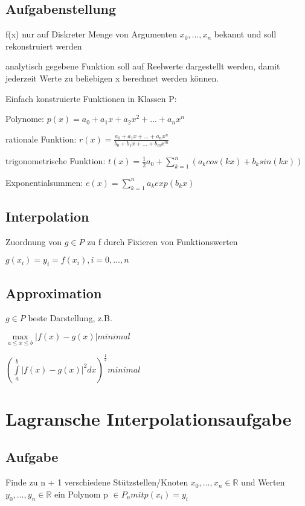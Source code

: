 \documentclass[12pt,a4paper]{article} %
\begin{document}
	\subsection{Aufgabenstellung}
	
	f(x) nur auf Diskreter Menge von Argumenten $x_0, ..., x_n$ bekannt und soll rekonstruiert werden
	
	analytisch gegebene Funktion soll auf Reelwerte dargestellt werden, damit jederzeit Werte zu beliebigen x berechnet werden können.
	
	Einfach konstruierte Funktionen in Klassen P:
	
	Polynome: $p(x) = a_0 + a_1x + a_2x^2 + ... + a_nx^n$
	
	rationale Funktion: $r(x) = \frac{a_0 + a_1x + ... + a_nx^n}{b_0 + b_1x + ... + b_mx^m}$
	
	trigonometrische Funktion: $t(x) = \frac{1}{2}a_0 + \sum\limits_{k = 1}^{n}(a_kcos(kx) + b_ksin(kx))$
	
	Exponentialsummen: $e(x) = \sum\limits_{k = 1}^{n}a_kexp(b_kx)$
	
	\subsection{Interpolation}
	
	Zuordnung von $g \in P$ zu f durch Fixieren von Funktionswerten
	
	$g(x_i) = y_i = f(x_i), i = 0, ..., n$
	
	\subsection{Approximation}
	
	$g \in P$ beste Darstellung, z.B. 
	
	$\max\limits_{a \le x \le b}|f(x) - g(x)| minimal$
	
	$(\int\limits_{a}^{b}|f(x) - g(x)|^2dx)^{\frac{1}{2}} minimal$
	
	\newpage
	
	\section{Lagransche Interpolationsaufgabe}
	
	\subsection{Aufgabe}
	
	Finde zu n + 1 verschiedene Stützstellen/Knoten $x_0, ..., x_n \in \mathbb{R}$ und Werten $y_0, ..., y_n \in \mathbb{R}$ ein Polynom p $\in P_n mit p(x_i) = y_i$
	
\end{document}
